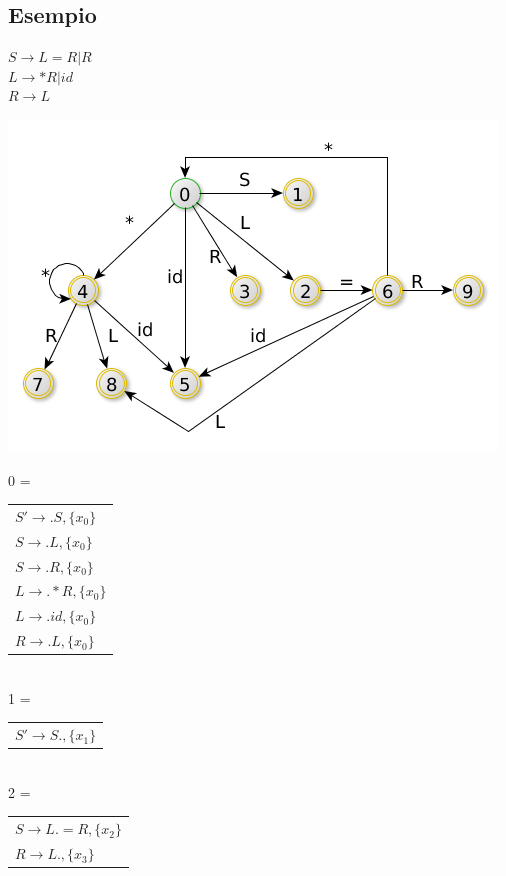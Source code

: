 \subsection{Esempio}

$S \rightarrow L = R | R$ \\
$L \rightarrow *R | id $ \\
$R \rightarrow L$ \\

\begin{center}
    \includegraphics[scale=0.6]{Chapters/Img/c05_05.png}\\
\end{center}

0 = 
\begin{tabular}{l}
	$S' \rightarrow .S, \{ x_0 \}$\\
	$S \rightarrow .L, \{ x_0 \}$\\
	$S \rightarrow .R, \{ x_0 \}$\\
	$L \rightarrow .*R, \{ x_0 \}$\\
	$L \rightarrow .id, \{ x_0 \}$\\
	$R \rightarrow .L, \{ x_0 \}$\\
\end{tabular}\\[5pt]

1 = 
\begin{tabular}{l}
	$S' \rightarrow S., \{ x_1 \}$\\
\end{tabular}\\[5pt]

2 = 
\begin{tabular}{l}
	$S \rightarrow L. = R, \{ x_2 \}$\\
	$R \rightarrow L., \{ x_3 \}$\\
\end{tabular}\\[5pt]

